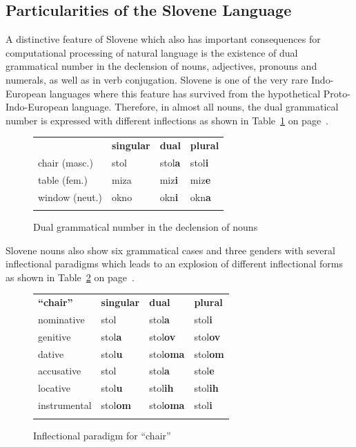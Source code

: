 \begin{multicols}{2}
\subsection{Particularities of the Slovene Language}

A distinctive feature of Slovene which also has important consequences for computational processing of natural language is the existence of dual grammatical number in the declension of nouns, adjectives, pronouns and numerals, as well as in verb conjugation. Slovene is one of the very rare Indo-European languages where this feature has survived from the hypothetical Proto-Indo-European language. Therefore, in almost all nouns, the dual grammatical number is expressed with different inflections as shown in Table~\ref{fig:dual} on page~\pageref{fig:dual}.

\begin{figure}[htb]
\begin{tabularx}{\textwidth}{XXXX} \toprule\addlinespace
   & \textbf{singular} & \textbf{dual} & \textbf{plural} \\ \addlinespace\midrule\addlinespace
  chair (masc.)  & stol     &  stol\textbf{a} & stol\textbf{i} \\ 
  table (fem.)   & miza     &  miz\textbf{i}  & miz\textbf{e} \\ 
  window (neut.) & okno     &  okn\textbf{i}  & okn\textbf{a} \\ \addlinespace\bottomrule
  \end{tabularx}
  \caption{Dual grammatical number in the declension of nouns}
  \label{fig:dual}
\end{figure}

Slovene nouns also show six grammatical cases and three genders with several inflectional paradigms which leads to an explosion of different inflectional forms as shown in Table~\ref{fig:inflection} on page~\pageref{fig:inflection}.

\begin{figure}[htb]
\begin{tabularx}{\textwidth}{XXXX} \toprule\addlinespace
  \textbf{``chair''}   & \textbf{singular} & \textbf{dual} & \textbf{plural} \\ \addlinespace\midrule\addlinespace
  nominative   & stol     &  stol\textbf{a}  & stol\textbf{i} \\ 
  genitive     & stol\textbf{a}    &  stol\textbf{ov}  & stol\textbf{ov} \\ 
  dative       & stol\textbf{u}     &  stol\textbf{oma}  & stol\textbf{om} \\ 
  accusative   & stol     &  stol\textbf{a}  & stol\textbf{e} \\ 
  locative     & stol\textbf{u}     &  stol\textbf{ih}  & stol\textbf{ih} \\ 
  instrumental & stol\textbf{om}     &  stol\textbf{oma}  & stol\textbf{i} \\ \addlinespace\bottomrule
  \end{tabularx}
  \caption{Inflectional paradigm for ``chair''}
  \label{fig:inflection}
\end{figure}


\end{multicols}
